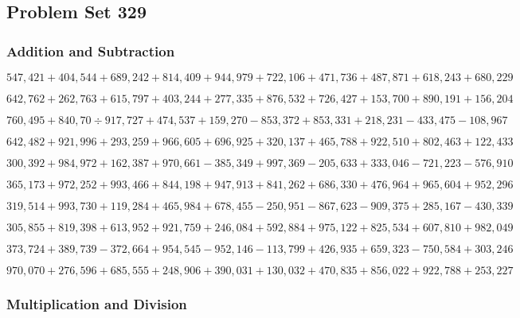\hypertarget{problem-set-329}{%
\subsection{Problem Set 329}\label{problem-set-329}}

\hypertarget{addition-and-subtraction}{%
\subsubsection{Addition and
Subtraction}\label{addition-and-subtraction}}

\(547,421+404,544+689,242+814,409+944,979+722,106+471,736+487,871+618,243+680,229\)

\(642,762+262,763+615,797+403,244+277,335+876,532+726,427+153,700+890,191+156,204\)

\(760,495+840,70÷917,727+474,537+159,270-853,372+853,331+218,231-433,475-108,967\)

\(642,482+921,996+293,259+966,605+696,925+320,137+465,788+922,510+802,463+122,433\)

\(300,392+984,972+162,387+970,661-385,349+997,369-205,633+333,046-721,223-576,910\)

\(365,173+972,252+993,466+844,198+947,913+841,262+686,330+476,964+965,604+952,296\)

\(319,514+993,730+119,284+465,984+678,455-250,951-867,623-909,375+285,167-430,339\)

\(305,855+819,398+613,952+921,759+246,084+592,884+975,122+825,534+607,810+982,049\)

\(373,724+389,739-372,664+954,545-952,146-113,799+426,935+659,323-750,584+303,246\)

\(970,070+276,596+685,555+248,906+390,031+130,032+470,835+856,022+922,788+253,227\)

\hypertarget{multiplication-and-division}{%
\subsubsection{Multiplication and
Division}\label{multiplication-and-division}}

